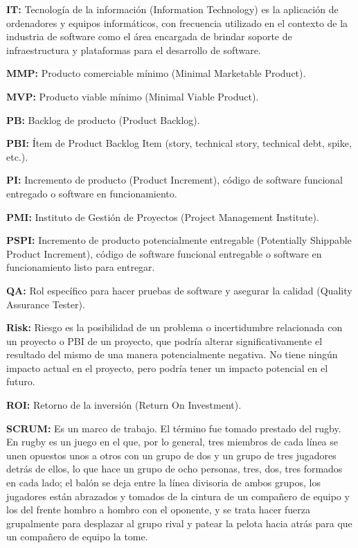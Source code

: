\begin{description}
  \item {\textbf{IT:} Tecnología de la información (Information Technology) es la aplicación de ordenadores y equipos informáticos, con frecuencia utilizado en el contexto de la industria de software como el área encargada de brindar soporte de infraestructura y plataformas para el desarrollo de software.}
  
  \item {\textbf{MMP:} Producto comerciable mínimo (Minimal Marketable Product).}
  
  \item {\textbf{MVP:} Producto viable mínimo (Minimal Viable Product).}
  
  \item {\textbf{PB:} Backlog de producto (Product Backlog).}
  
  \item {\textbf{PBI:} Ítem de Product Backlog Item (story, technical story, technical debt, spike, etc.).}
  
  \item {\textbf{PI:} Incremento de producto (Product Increment), código de software funcional entregado o software en funcionamiento.}
  
  \item {\textbf{PMI:} Instituto de Gestión de Proyectos (Project Management Institute).}
  
  \item {\textbf{PSPI:} Incremento de producto potencialmente entregable (Potentially Shippable Product Increment), código de software funcional entregable o software en funcionamiento listo para entregar.}
  
  \item {\textbf{QA:} Rol específico para hacer pruebas de software y asegurar la calidad (Quality Assurance Tester).}
  
  \item {\textbf{Risk:} Riesgo es la posibilidad de un problema o incertidumbre relacionada con un proyecto o PBI de un proyecto, que podría alterar significativamente el resultado del mismo de una manera potencialmente negativa. No tiene ningún impacto actual en el proyecto, pero podría tener un impacto potencial en el futuro.}
  
  \item {\textbf{ROI:} Retorno de la inversión (Return On Investment).}
  
  \item {\textbf{SCRUM:} Es un marco de trabajo. El término fue tomado prestado del rugby. En rugby es un juego en el que, por lo general, tres miembros de cada línea se unen opuestos unos a otros con un grupo de dos y un grupo de tres jugadores detrás de ellos, lo que hace un grupo de ocho personas, tres, dos, tres formados en cada lado; el balón se deja entre la línea divisoria de ambos grupos, los jugadores están abrazados y tomados de la cintura de un compañero de equipo y los del frente hombro a hombro con el oponente, y se trata hacer fuerza grupalmente para desplazar al grupo rival y patear la pelota hacia atrás para que un compañero de equipo la tome.}
  

\end{description}
